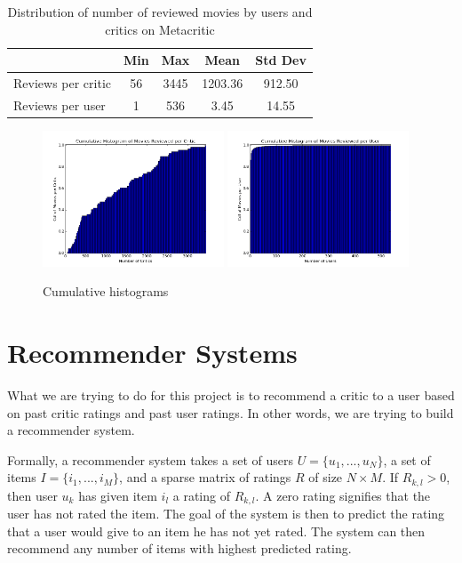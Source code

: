 \documentclass[12pt]{article}
\begin{document}
	\begin{table}[H]
	\centering
	 \caption{Distribution of number of reviewed movies by users and critics on Metacritic}

	 \begin{tabular}{ l | c | c | c | c }
	 \hline
	 &  Min & Max & Mean & Std Dev  \\
	 \hline
	 Reviews per critic & 56 & 3445 & 1203.36 & 912.50 \\
	 Reviews per user & 1 & 536 & 3.45 & 14.55 \\
	 \hline
	 \end{tabular}
	 \end{table}


	 \begin{figure}[H]
	    \centering
	    \includegraphics[width=0.48\textwidth]{plots/plot_m_crit_top.png}
	    \includegraphics[width=0.48\textwidth]{plots/plot_m_crit_usr.png}
	    \caption{Cumulative histograms }
	    \label{fig:m_crit}
	\end{figure}

\section{Recommender Systems}

What we are trying to do for this project is to recommend a critic to a user based on past critic ratings and past user ratings. In other words, we are trying to build a recommender system.

Formally, a recommender system takes a set of users $U = \{u_1, ..., u_N\}$, a
set of items $I = \{i_1, ..., i_M\}$, and a sparse matrix of ratings
$R$ of size $N \times M$. If $R_{k,l} > 0$, then user $u_k$ has given item $i_l$ a rating of $R_{k,l}$. A zero rating signifies that the
user has not rated the item. The goal of the system is then to predict the rating that a user would give to an item he has not yet rated. The system can
then recommend any number of items with highest predicted rating.
\end{document}
